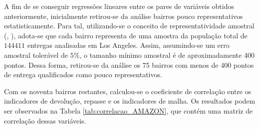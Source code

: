 
A fim de se conseguir regressões lineares entre os pares de variáveis obtidos anteriormente, inicialmente retirou-se da análise bairros pouco representativos estatisticamente. 
Para tal, utilizando-se o conceito de representatividade amostral (, \citeyear{medri2011analise}), adota-se que cada bairro representa de uma amostra da população total de $144411$ entregas analisadas em Los Angeles.
Assim, assumindo-se um erro amostral tolerável de $5\%$, o tamanho mínimo amostral é de aproximadamente 400 pontos. 
Dessa forma, retirou-se da análise os 75 bairros com menos de 400 pontos de entrega qualificados como pouco representativos.

Com os noventa bairros restantes, calculou-se o coeficiente de correlação entre os indicadores de devolução, repasse e os indicadores de malha. 
Os resultados podem ser observados na Tabela \ref{tab:correlacao_AMAZON}, que contém uma matriz de correlação dessas variáveis.

